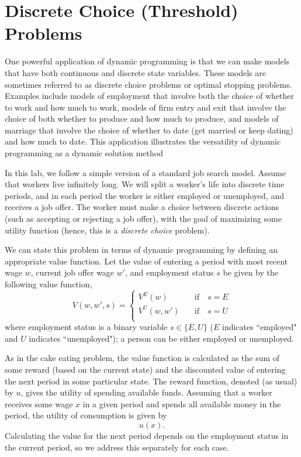 \section*{Discrete Choice (Threshold) Problems}\label{SecDiscrChoice}

One powerful application of dynamic programming is that we can make
models that have both continuous and discrete state variables. These models are sometimes referred to as
discrete choice problems or optimal stopping problems.  Examples include models of employment that involve both
the choice of whether to work and how much to work, models of firm entry and exit that involve the choice of both
whether to produce and how much to produce, and models of marriage that involve the choice of whether to date
(get married or keep dating) and how much to date.
This application illustrates the versatility of dynamic programming as a dynamic solution method

In this lab, we follow a simple version of a standard job search model.
Assume that workers live infinitely long.
We will split a worker's life into discrete time periods, and in each period the worker is either
employed or unemployed, and receives a job offer. The worker must make a choice between discrete actions
(such as accepting or rejecting a job offer), with the goal of maximizing some utility function (hence,
this is a \emph{discrete choice} problem).

We can state this problem in terms of dynamic programming by defining an appropriate value function.
Let the value of entering a period with most recent wage $w$,
current job offer wage $w'$, and employment status $s$ be given by the following value function,
\begin{equation}\label{EqV}
   V(w,w',s) = \begin{cases}
                  V^E(w)    \quad&\text{if}\quad s = E \\
                  V^U(w,w') \quad&\text{if}\quad s = U \\
               \end{cases}
\end{equation}
where employment status is a binary variable $s\in\{E,U\}$ ($E$ indicates ``employed" and $U$ indicates ``unemployed");
a person can be either employed or unemployed.

As in the cake eating problem, the value function is calculated as the sum of some reward (based on the
current state) and the discounted value of entering the next period in some particular state.
The reward function, denoted (as usual) by $u$, gives the utility of spending available funds.
Assuming that a worker receives some wage $x$ in a given period and spends all available money in the period,
the utility of consumption is given by
\[
u(x).
\]
Calculating the value for the next period depends on the employment status in the current period, so we address
this separately for each case.

